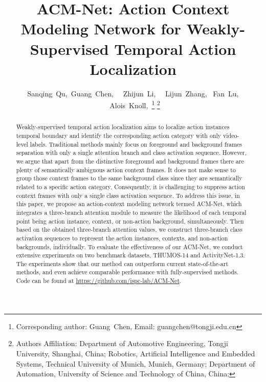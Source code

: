 \documentclass[journal,comsoc]{IEEEtran}
\begin{document}
\title{ACM-Net: Action Context Modeling Network for Weakly-Supervised Temporal Action Localization}

\author{Sanqing~Qu,~Guang~Chen,~ ~Zhijun~Li,~ ~Lijun~Zhang, ~Fan~Lu,  ~Alois~Knoll,~\thanks{Corresponding author:  Guang~Chen, Email: guangchen@tongji.edu.cn}
\thanks{Authors Affiliation: Department of Automotive Engineering, Tongji University, Shanghai, China; Robotics, Artificial Intelligence and Embedded Systems, Technical University of Munich, Munich, Germany;
Department of Automation, University of Science and Technology of China, China;}}

























\maketitle

\begin{abstract}
\par Weakly-supervised temporal action localization aims to localize action instances temporal boundary and identify the corresponding action category with only video-level labels. Traditional methods mainly focus on foreground and background frames separation with only a single attention branch and class activation sequence. However, we argue that apart from the distinctive foreground and background frames there are plenty of semantically ambiguous action context frames. It does not make sense to group those context frames to the same background class since they are semantically related to a specific action category. Consequently, it is challenging to suppress action context frames with only a single class activation sequence. To address this issue, in this paper, we propose an action-context modeling network termed ACM-Net, which integrates a three-branch attention module to measure the likelihood of each temporal point being action instance, context, or non-action background, simultaneously. Then based on the obtained three-branch attention values, we construct three-branch class activation sequences to represent the action instances, contexts, and non-action backgrounds, individually. To evaluate the effectiveness of our ACM-Net, we conduct extensive experiments on two benchmark datasets, THUMOS-14 and ActivityNet-1.3. The experiments show that our method can outperform current state-of-the-art methods, and even achieve comparable performance with fully-supervised methods. Code can be found at \url{https://github.com/ispc-lab/ACM-Net}.
\end{abstract}
\end{document}
